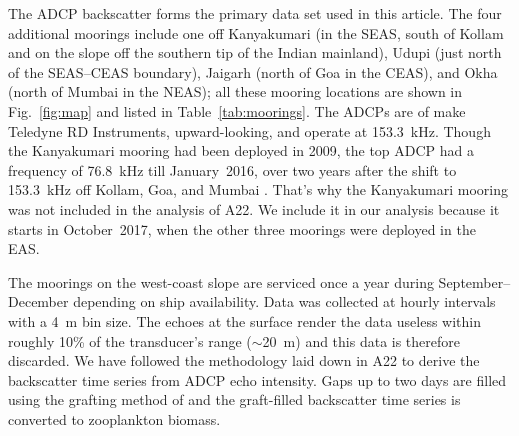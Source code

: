 \documentclass[authoryear,review,11pt]{elsarticle}
\begin{document}
The ADCP backscatter forms the primary data set used in this article.  The four additional moorings include one off Kanyakumari (in the SEAS, south of Kollam and on the slope off the southern tip of the Indian mainland), Udupi (just north of the SEAS--CEAS boundary), Jaigarh (north of Goa in the CEAS), and Okha (north of Mumbai in the NEAS); all these mooring locations are shown in Fig.~\ref{fig:map} and listed in Table~\ref{tab:moorings}.  The ADCPs are of make Teledyne RD Instruments, upward-looking, and operate at 153.3~kHz.  Though the Kanyakumari mooring had been deployed in 2009, the top ADCP had a frequency of 76.8~kHz till January~2016, over two years after the shift to 153.3~kHz off Kollam, Goa, and Mumbai  \citep{chaudhuri2020observed}.  That's why the Kanyakumari mooring was not included in the analysis of A22.  We include it in our analysis because it starts in October~2017, when the other three moorings were deployed in the EAS.

The moorings on the west-coast slope are serviced once a year during September--December depending on ship availability. Data was collected at hourly intervals with a 4~m bin size. The echoes at the surface render the data useless within roughly 10\% of the transducer's range ($\sim$20~m) and this data is therefore discarded.  We have followed the methodology laid down in A22 to derive the backscatter time series from ADCP echo intensity. Gaps up to two days are filled using the grafting method of \citet{mukhopadhyay2017st} and the graft-filled backscatter time series is converted to zooplankton biomass.

\end{document}

